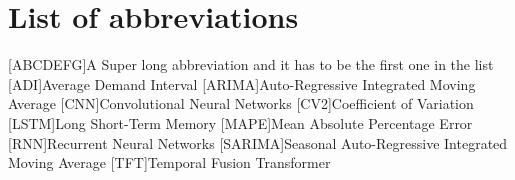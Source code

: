 
\somecommand

\somemorecommand

\blablabla

\blablabla

\chapter*{List of abbreviations}

\begin{acronym}[abcdefg]
	[ABCDEFG]{A Super long abbreviation and it has to be the first one in the list}
	[ADI]{Average Demand Interval}
	[ARIMA]{Auto-Regressive Integrated Moving Average}
	[CNN]{Convolutional Neural Networks}
	[CV2]{Coefficient of Variation}
	[LSTM]{Long Short-Term Memory}
	[MAPE]{Mean Absolute Percentage Error}
	[RNN]{Recurrent Neural Networks}
	[SARIMA]{Seasonal Auto-Regressive Integrated Moving Average}
	[TFT]{Temporal Fusion Transformer}
\end{acronym}


\blablabla

\newpage



\blablabla
